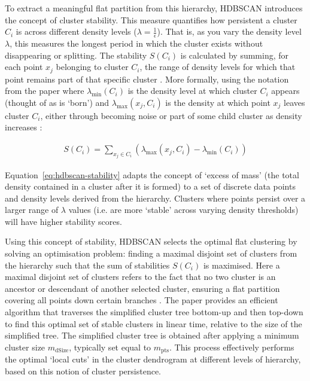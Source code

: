 \documentclass[10pt,oneside]{report}
\begin{document}
To extract a meaningful flat partition from this hierarchy, HDBSCAN introduces the concept of cluster stability. This measure quantifies how persistent a cluster $C_i$ is across different density levels ($\lambda = \frac 1 \epsilon$). That is, as you vary the density level $\lambda$, this measures the longest period in which the cluster exists without disappearing or splitting. The stability $S(C_i)$ is calculated by summing, for each point $x_j$ belonging to cluster $C_i$, the range of density levels for which that point remains part of that specific cluster \cite{campello2013density}. More formally, using the notation from the paper where $\lambda_{\text{min}}(C_i)$ is the density level at which cluster $C_i$ appears (thought of as is `born') and $\lambda_{\text{max}}(x_j, C_i)$ is the density at which point $x_j$ leaves cluster $C_i$, either through becoming noise or part of some child cluster as density increases \cite{campello2013density}:

\begin{align}
S(C_i) = \sum_{x_j \in C_i} (\lambda_{\text{max}}(x_j, C_i) - \lambda_{\text{min}}(C_i))
\label{eq:hdbscan-stability}
\end{align}

Equation~\ref{eq:hdbscan-stability} adapts the concept of `excess of mass' (the total density contained in a cluster after it is formed) \cite{muller1991excess} to a set of discrete data points and density levels derived from the hierarchy. Clusters where points persist over a larger range of $\lambda$ values (i.e. are more `stable' across varying density thresholds) will have higher stability scores.

Using this concept of stability, HDBSCAN selects the optimal flat clustering by solving an optimisation problem: finding a maximal disjoint set of clusters from the hierarchy  such that the sum of stabilities $S(C_i)$ is maximised. Here a maximal disjoint set of clusters refers to the fact that no two cluster is an ancestor or descendant of another selected cluster, ensuring a flat partition covering all points down certain branches \cite{campello2013density}. The paper provides an efficient algorithm that traverses the simplified cluster tree bottom-up and then top-down to find this optimal set of stable clusters in linear time, relative to the size of the simplified tree. The simplified cluster tree is obtained after applying a minimum cluster size $m_{\text{dSize}}$, typically set equal to $m_{\text{pts}}$. This process effectively performs the optimal `local cuts' in the cluster dendrogram at different levels of hierarchy, based on this notion of cluster persistence.
\end{document}
